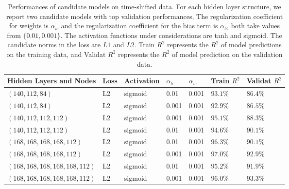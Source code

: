\documentclass[thmsa,onecolumn,12pt]{article}%
\begin{document}
\begin{table}[!htb]
\caption{Performances of candidate models on time-shifted data. For each hidden layer structure, we report two candidate models with top validation performances,  The regularization coefficient for weights is $\alpha_w$ and the regularization coefficient for the bias term is $\alpha_b$, both take values from $\{0.01, 0.001\}$. The activation functions under considerations are tanh and sigmoid. The candidate norms in the loss are $L1$ and $L2$. Train $R^2$ represents the $R^2$ of model predictions on the training data, and Validat $R^2$ represents the $R^2$ of model prediction on the validation data.}
\label{table5}
\centering%
\begin{tabular}{ p{5cm} p{1cm} p{2cm} p{0.75cm} p{0.75cm} p{1.8cm} p{1.9cm}  }
\toprule%
Hidden Layers and Nodes &Loss &Activation & $\alpha_b$ & $\alpha_w$ &Train $R^2$ &Validat $R^2$\\
\toprule

$(140,112,84)$                  &L2           &sigmoid       &0.01   &0.001   &$93.1\%$         &$86.4\%$ \\
$(140,112,84)$                  &L2		     &sigmoid       &0.001    &0.001   &$92.9\%$         &$86.5\%$ \\
$(140,112,112,112)$          &L2 		&sigmoid      &0.001    &0.001   &$95.1\%$        &$88.3\%$ \\
$(140,112,112,112)$          &L2 		&sigmoid      &0.01    &0.001   &$94.6\%$          &$90.1\%$ \\
$(168,168,168,168,112)$         &L2		     &sigmoid           &0.01     &0.001   &$96.3\%$         &$90.1\%$ \\
$(168,168,168,168,112)$         &L2		     &sigmoid      &0.001    &0.001    &$97.0\%$      &$92.9\%$ \\
$(168,168,168,168,168,112)$  &L2			&sigmoid           &0.01      &0.001    &$95.2\%$         &$91.9\%$ \\
$(168,168,168,168,168,112)$  &L2			&sigmoid           &0.001      &0.001    &$96.0\%$         &$93.3\%$ \\
\bottomrule
\end{tabular}
\end{table}
\end{document}
